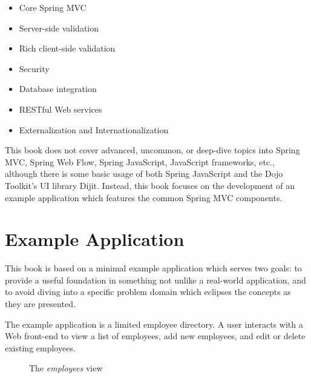 \documentclass{article}
\begin{document}
\begin{itemize}
\item Core Spring MVC
\item Server-side validation
\item Rich client-side validation
\item Security
\item Database integration
\item RESTful Web services
\item Externalization and Internationalization
\end{itemize}

This book does not cover advanced, uncommon, or deep-dive topics into Spring MVC, Spring Web Flow, Spring JavaScript, JavaScript frameworks, etc., although there is some basic usage of both Spring JavaScript and the Dojo Toolkit's UI library Dijit.  Instead, this book focuses on the development of an example application which features the common Spring MVC components.

\pagebreak
\section{Example Application}

This book is based on a minimal example application which serves two goals: to provide a useful foundation in something not unlike a real-world application, and to avoid diving into a specific problem domain which eclipses the concepts as they are presented.

The example application is a limited employee directory. A user interacts with a Web front-end to view a list of employees, add new employees, and edit or delete existing employees.

\vspace{10pt}
\begin{figure}[H]
\begin{center}
\end{center}
\caption{The \emph{employees} view}
\label{fig:core/view-employees}
\end{figure}
\end{document}
